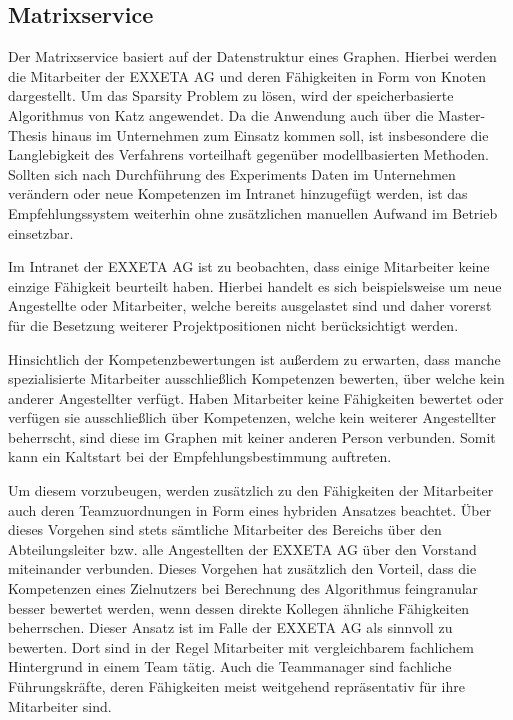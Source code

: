 \subsection{Matrixservice}
\label{ch:methodik:versuchsaufbau:systemarchitektur:matrixservice}
Der Matrixservice basiert auf der Datenstruktur eines Graphen. Hierbei werden die Mitarbeiter der EXXETA AG und deren Fähigkeiten in Form von Knoten dargestellt. Um das Sparsity Problem zu lösen, wird der speicherbasierte Algorithmus von Katz angewendet. Da die Anwendung auch über die Master-Thesis hinaus im Unternehmen zum Einsatz kommen soll, ist insbesondere die Langlebigkeit des Verfahrens vorteilhaft gegenüber modellbasierten Methoden. Sollten sich nach Durchführung des Experiments Daten im Unternehmen verändern oder neue Kompetenzen im Intranet hinzugefügt werden, ist das Empfehlungssystem weiterhin ohne zusätzlichen manuellen Aufwand im Betrieb einsetzbar.

Im Intranet der EXXETA AG ist zu beobachten, dass einige Mitarbeiter keine einzige Fähigkeit beurteilt haben. Hierbei handelt es sich beispielsweise um neue Angestellte oder Mitarbeiter, welche bereits ausgelastet sind und daher vorerst für die Besetzung weiterer Projektpositionen nicht berücksichtigt werden.

Hinsichtlich der Kompetenzbewertungen ist außerdem zu erwarten, dass manche spezialisierte Mitarbeiter ausschließlich Kompetenzen bewerten, über welche kein anderer Angestellter verfügt. Haben Mitarbeiter keine Fähigkeiten bewertet oder verfügen sie ausschließlich über Kompetenzen, welche kein weiterer Angestellter beherrscht, sind diese im Graphen mit keiner anderen Person verbunden. Somit kann ein Kaltstart bei der Empfehlungsbestimmung auftreten.

Um diesem vorzubeugen, werden zusätzlich zu den Fähigkeiten der Mitarbeiter auch deren Teamzuordnungen in Form eines hybriden Ansatzes beachtet. Über dieses Vorgehen sind stets sämtliche Mitarbeiter des Bereichs \JES über den Abteilungsleiter bzw. alle Angestellten der EXXETA AG über den Vorstand miteinander verbunden. Dieses Vorgehen hat zusätzlich den Vorteil, dass die Kompetenzen eines Zielnutzers bei Berechnung des Algorithmus feingranular besser bewertet werden, wenn dessen direkte Kollegen ähnliche Fähigkeiten beherrschen. Dieser Ansatz ist im Falle der EXXETA AG als sinnvoll zu bewerten. Dort sind in der Regel Mitarbeiter mit vergleichbarem fachlichem Hintergrund in einem Team tätig. Auch die Teammanager sind fachliche Führungskräfte, deren Fähigkeiten meist weitgehend repräsentativ für ihre Mitarbeiter sind.

